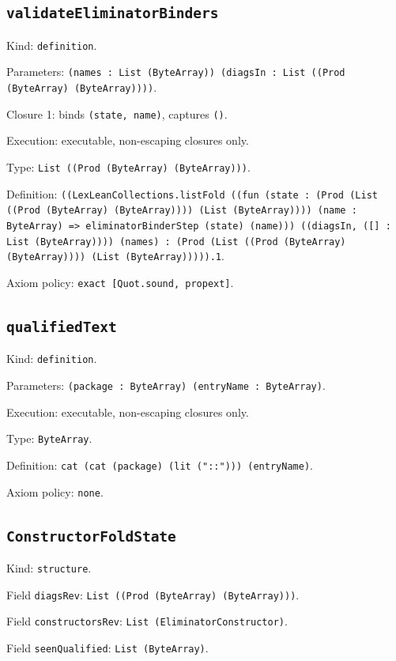 \documentclass[11pt]{article}
\begin{document}
\subsection*{\texttt{validateEliminatorBinders}}
\noindent Kind: \texttt{definition}.\par
\noindent Parameters: \texttt{(names : List (ByteArray)) (diagsIn : List ((Prod (ByteArray) (ByteArray))))}.\par
\noindent Closure 1: binds \texttt{(state, name)}, captures \texttt{()}.\par
\noindent Execution: executable, non-escaping closures only.\par
\noindent Type: \texttt{List ((Prod (ByteArray) (ByteArray)))}.\par
\noindent Definition: \texttt{((LexLeanCollections.listFold ((fun (state : (Prod (List ((Prod (ByteArray) (ByteArray)))) (List (ByteArray)))) (name : ByteArray) => eliminatorBinderStep (state) (name))) ((diagsIn, ([] : List (ByteArray)))) (names) : (Prod (List ((Prod (ByteArray) (ByteArray)))) (List (ByteArray))))).1}.\par
\noindent Axiom policy: \texttt{exact [Quot.sound, propext]}.\par
\subsection*{\texttt{qualifiedText}}
\noindent Kind: \texttt{definition}.\par
\noindent Parameters: \texttt{(package : ByteArray) (entryName : ByteArray)}.\par
\noindent Execution: executable, non-escaping closures only.\par
\noindent Type: \texttt{ByteArray}.\par
\noindent Definition: \texttt{cat (cat (package) (lit ("::"))) (entryName)}.\par
\noindent Axiom policy: \texttt{none}.\par
\subsection*{\texttt{ConstructorFoldState}}
\noindent Kind: \texttt{structure}.\par
\noindent Field \texttt{diagsRev}: \texttt{List ((Prod (ByteArray) (ByteArray)))}.\par
\noindent Field \texttt{constructorsRev}: \texttt{List (EliminatorConstructor)}.\par
\noindent Field \texttt{seenQualified}: \texttt{List (ByteArray)}.\par
\end{document}
